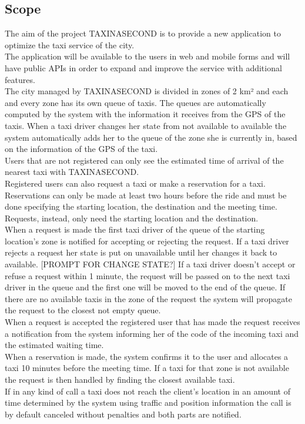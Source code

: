 \documentclass{article}
\begin{document}
	\subsection{Scope}
	The aim of the project TAXINASECOND is to provide a new application to optimize the taxi service of the city. 
	\\The application will be available to the users in web and mobile forms and will have public APIs in order to expand and improve the service with additional features.
	\\The city managed by TAXINASECOND is divided in zones of 2 km² and each and every zone has its own queue of taxis. The queues are automatically computed by the system with the information it receives from the GPS of the taxis. When a taxi driver changes her state from not available to available the system automatically adds her to the queue of the zone she is currently in, based on the information of the GPS of the taxi. 
	\\Users that are not registered can only see the estimated time of arrival of the nearest taxi with TAXINASECOND.\@
	\\Registered users can also request a taxi or make a reservation for a taxi. Reservations can only be made at least two hours before the ride and must be done specifying the starting location, the destination and the meeting time. Requests, instead, only need the starting location and the destination.
	\\When a request is made the first taxi driver of the queue of the starting location’s zone is notified for accepting or rejecting the request. If a taxi driver rejects a request her state is put on unavailable until her changes it back to available. [PROMPT FOR CHANGE STATE?] If a taxi driver doesn’t accept or refuse a request within 1 minute, the request will be passed on to the next taxi driver in the queue and the first one will be moved to the end of the queue. If there are no available taxis in the zone of the request the system will propagate the request to the closest not empty queue.
	\\When a request is accepted the registered user that has made the request receives a notification from the system informing her of the code of the incoming taxi and the estimated waiting time.
	\\When a reservation is made, the system confirms it to the user and allocates a taxi 10 minutes before the meeting time. If a taxi for that zone is not available the request is then handled by finding the closest available taxi. 
	\\If in any kind of call a taxi does not reach the client’s location in an amount of time determined by the system using traffic and position information the call is by default canceled without penalties and both parts are notified.
\end{document}
